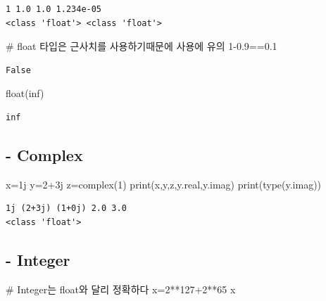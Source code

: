 \documentclass[
  letterpaper,
  DIV=11,
  numbers=noendperiod]{scrreprt}
\newenvironment{Shaded}{\begin{snugshade}}{\end{snugshade}}
\newcommand{\BuiltInTok}[1]{\textcolor[rgb]{0.00,0.23,0.31}{#1}}
\newcommand{\CommentTok}[1]{\textcolor[rgb]{0.37,0.37,0.37}{#1}}
\newcommand{\DecValTok}[1]{\textcolor[rgb]{0.68,0.00,0.00}{#1}}
\newcommand{\FloatTok}[1]{\textcolor[rgb]{0.68,0.00,0.00}{#1}}
\newcommand{\NormalTok}[1]{\textcolor[rgb]{0.00,0.23,0.31}{#1}}
\newcommand{\OperatorTok}[1]{\textcolor[rgb]{0.37,0.37,0.37}{#1}}
\newcommand{\OtherTok}[1]{\textcolor[rgb]{0.00,0.23,0.31}{#1}}
\newcommand{\StringTok}[1]{\textcolor[rgb]{0.13,0.47,0.30}{#1}}
\begin{document}
\begin{verbatim}
1 1.0 1.0 1.234e-05
<class 'float'> <class 'float'>
\end{verbatim}

\begin{Shaded}
\begin{Highlighting}[]
\CommentTok{\# float 타입은 근사치를 사용하기때문에 사용에 유의}
\DecValTok{1}\OperatorTok{{-}}\FloatTok{0.9}\OperatorTok{==}\FloatTok{0.1}
\end{Highlighting}
\end{Shaded}

\begin{verbatim}
False
\end{verbatim}

\begin{Shaded}
\begin{Highlighting}[]
\BuiltInTok{float}\NormalTok{(}\StringTok{\textquotesingle{}inf\textquotesingle{}}\NormalTok{)}
\end{Highlighting}
\end{Shaded}

\begin{verbatim}
inf
\end{verbatim}

\subsection{- Complex}\label{complex}

\begin{Shaded}
\begin{Highlighting}[]
\NormalTok{x}\OperatorTok{=}\OtherTok{1j}
\NormalTok{y}\OperatorTok{=}\DecValTok{2}\OperatorTok{+}\OtherTok{3j}
\NormalTok{z}\OperatorTok{=}\BuiltInTok{complex}\NormalTok{(}\DecValTok{1}\NormalTok{)}
\BuiltInTok{print}\NormalTok{(x,y,z,y.real,y.imag)}
\BuiltInTok{print}\NormalTok{(}\BuiltInTok{type}\NormalTok{(y.imag))}
\end{Highlighting}
\end{Shaded}

\begin{verbatim}
1j (2+3j) (1+0j) 2.0 3.0
<class 'float'>
\end{verbatim}

\subsection{- Integer}\label{integer}

\begin{Shaded}
\begin{Highlighting}[]
\CommentTok{\# Integer는 float와 달리 정확하다}
\NormalTok{x}\OperatorTok{=}\DecValTok{2}\OperatorTok{**}\DecValTok{127}\OperatorTok{+}\DecValTok{2}\OperatorTok{**}\DecValTok{65} 
\NormalTok{x}
\end{Highlighting}
\end{Shaded}
\end{document}
